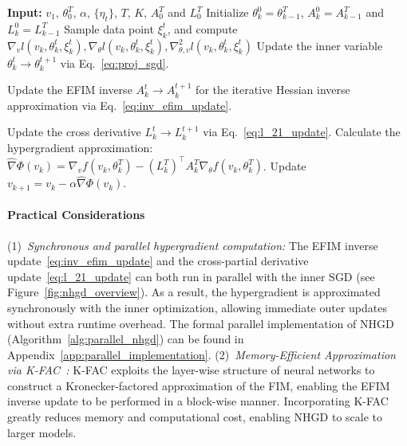 \documentclass[11 pt]{article}
\begin{document}
\begin{algorithm}[htbp]
    \caption{Natural Hypergradient Descent}
    \label{alg:hypergradient_descent}
    \begin{algorithmic}[1]
    \STATE \textbf{Input:} $v_1$, $\theta_0^T$, $\alpha$, $\{\eta_t\}$, $T$, $K$, $A_0^T$ and $L_0^{T}$
        \STATE Initialize  $\theta_k^{0}=\theta_{k-1}^{T}$, $A_k^0=A_{k-1}^T$ and $L_k^0=L_{k-1}^T$ 
            \STATE Sample data point $\xi_k^t$, and compute $\nabla_v l (v_k,\theta_k^t,\xi_k^t), \nabla_\theta l (v_k,\theta_k^t,\xi_k^t), \nabla_{\theta,v}^2 l (v_k,\theta_k^t, \xi_k^t)$
            \STATE  Update the inner variable $\theta_{k}^{t} \to \theta_{k}^{t+1}$ via Eq.~\eqref{eq:proj_sgd}.
            \STATE \colorbox{cyan!15}{\parbox{\dimexpr\linewidth-2\fboxsep}{\strut Update the EFIM inverse $A_k^{t} \to A_k^{t+1}$ for the iterative Hessian inverse approximation via Eq.~\eqref{eq:inv_efim_update}.}
            }
            \STATE Update the cross derivative $L^{t}_k \to L^{t+1}_k$ via Eq.~\eqref{eq:l_21_update}.
        \ENDFOR
        \STATE Calculate the hypergradient approximation:
        $\widehat{\nabla} \Phi(v_k)=\nabla_vf(v_k, \theta_k^T)- (L_k^T)^\top A_k^T \nabla_\theta f(v_k,\theta_k^T)$.
        \STATE Update $v_{k+1} = v_k - \alpha \widehat{\nabla} \Phi(v_k)$.
    \ENDFOR
    \end{algorithmic}
    \end{algorithm}

\paragraph{Practical Considerations}

(1)~\textit{Synchronous and parallel hypergradient computation:}
The EFIM inverse update~\eqref{eq:inv_efim_update} and the cross-partial derivative update~\eqref{eq:l_21_update} can both run in parallel with the inner SGD (see Figure~\ref{fig:nhgd_overview}). As a result, the hypergradient is approximated synchronously with the inner optimization, allowing immediate outer updates without extra runtime overhead.
The formal parallel implementation of NHGD (Algorithm~\ref{alg:parallel_nhgd}) can be found in Appendix~\ref{app:parallel_implementation}.
(2)~\textit{Memory-Efficient Approximation via K-FAC~\cite{martens2015optimizing}:} 
K-FAC exploits the layer-wise structure of neural networks to
construct a Kronecker-factored approximation of the FIM, enabling the EFIM inverse update to be performed in a block-wise manner. Incorporating K-FAC greatly reduces memory and computational cost, enabling NHGD to scale to larger models.  
\end{document}
